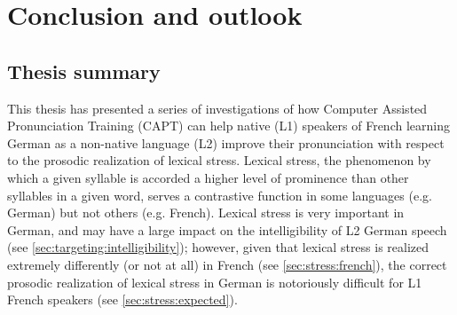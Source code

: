 %
%
\chapter{Conclusion and outlook}
\label{chap:conclusion}


\section{Thesis summary}
 \label{sec:conclusion:summary}
 
 This thesis has presented a series of investigations of how Computer Assisted Pronunciation Training (CAPT) can help native (L1) speakers of French learning German as a non-native language (L2) improve their pronunciation with respect to the prosodic realization of lexical stress.
 Lexical stress, the phenomenon by which a given syllable is accorded a higher level of prominence than other syllables in a given word, serves a contrastive function in some languages (e.g. German) but not others (e.g. French).
 Lexical stress is very important in German, and may have a large impact on the intelligibility of L2 German speech (see \cref{sec:targeting:intelligibility}); however, given that lexical stress is realized extremely differently (or not at all) in French (see \cref{sec:stress:french}), the correct prosodic realization of lexical stress in German is notoriously difficult for L1 French speakers (see \cref{sec:stress:expected}). 
 
